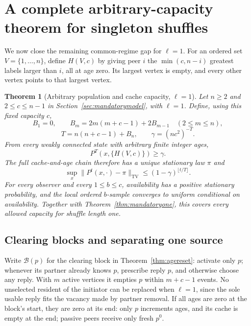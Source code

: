 \documentclass[11pt]{article}
\newtheorem{theorem}{Theorem}
\newcommand{\TV}{\mathrm{TV}}
\begin{document}
\section{A complete arbitrary-capacity theorem for singleton shuffles}
\label{sec:generalone}

We now close the remaining common-regime gap for $\ell=1$.
For an ordered set $V=\{1,\ldots,n\}$, define $H(V,c)$ by
giving peer $i$ the $\min(c,n-i)$ greatest labels larger than $i$,
all at age zero. Its largest vertex is empty, and every other
vertex points to that largest vertex.

\begin{theorem}[Arbitrary population and cache capacity, $\ell=1$]
\label{thm:generalone}
Let $n\ge2$ and $2\le c\le n-1$ in
Section~\ref{sec:mandatorymodel}, with $\ell=1$.
Define, using this fixed capacity $c$,
\[
 B_1=0,\qquad B_m=2m(m+c-1)+2B_{m-1}\quad(2\le m\le n),
\]
\[
 T=n(n+c-1)+B_n,\qquad \gamma=(nc^2)^{-T}.
\]
From every weakly connected state with arbitrary finite integer ages,
\[
 P^T(x,\{H(V,c)\})\ge\gamma .
\]
The full cache-and-age chain therefore has a unique stationary
law $\pi$ and
\[
 \sup_x\|P^t(x,\cdot)-\pi\|_{\TV}
 \le(1-\gamma)^{\lfloor t/T\rfloor}.
\]
For every observer and every $1\le b\le c$, availability has a
positive stationary probability, and the local ordered $b$-sample
converges to uniform conditional on availability.
Together with Theorem~\ref{thm:mandatoryone}, this covers every
allowed capacity for shuffle length one.
\end{theorem}

\subsection{Clearing blocks and separating one source}

Write $\mathcal B(p)$ for the clearing block in
Theorem~\ref{thm:agereset}: activate only $p$; whenever its partner
already knows $p$, prescribe reply $p$, and otherwise choose any
reply. With $m$ active vertices it empties $p$ within $m+c-1$
events. No unselected resident of the initiator can be replaced
when $\ell=1$, since the sole usable reply fits the vacancy made
by partner removal. If all ages are zero at the block's start,
they are zero at its end: only $p$ increments ages, and its cache
is empty at the end; passive peers receive only fresh $p^0$.
\end{document}
